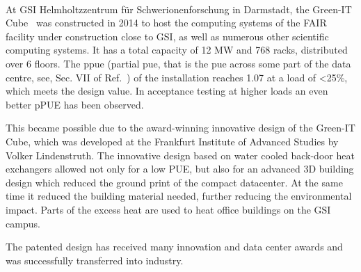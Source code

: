 \documentclass[../SustainableHEP.tex]{subfiles}
\begin{document}
\begin{bestpractice}\\
 At  GSI Helmholtzzentrum für Schwerionenforschung in Darmstadt, the Green-IT Cube~\cite{GreenITCube} was constructed in 2014 to host the computing systems of the FAIR facility under construction close to GSI, as well as numerous other scientific computing systems. It has a total capacity of 12 MW and 768 racks, distributed over 6 floors. The \acrshort{ppue} (partial \acrshort{pue}, that is the \acrshort{pue} across some part of the data centre, see, Sec. VII of Ref.~\cite{GreenGridPUE}) of the installation reaches 1.07 at a load of <25\%, which meets the design value. In acceptance testing at higher loads an even better pPUE has been observed.
 
This became possible due to the award-winning innovative design of the Green-IT Cube, which was developed at the Frankfurt Institute of Advanced Studies by Volker Lindenstruth. The innovative design based on water cooled back-door heat exchangers allowed not only for a low PUE, but also for an advanced 3D building design which reduced the ground print of the compact datacenter. At the same time it reduced the building material needed, further reducing the environmental impact. Parts of the excess heat are used to heat office buildings on the GSI campus.
 
The patented design has received many innovation and data center awards and was successfully transferred into industry.
\end{bestpractice}

\end{document}
